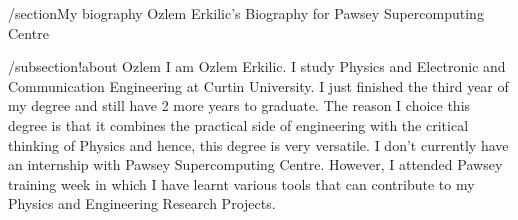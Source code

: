 /section{My biography}
Ozlem Erkilic's Biography for Pawsey Supercomputing Centre

/subsection{!about Ozlem }
I am Ozlem Erkilic. I study Physics and Electronic and Communication
Engineering at Curtin University. I just finished the third year of my degree
and still have 2 more years to graduate. The reason I choice this degree is
that it combines the practical side of engineering with the critical thinking
of Physics and hence, this degree is very versatile.
I don't currently have an internship with Pawsey Supercomputing Centre. However,
I attended Pawsey training week in which I have learnt various tools that can
contribute to my Physics and Engineering Research Projects.
